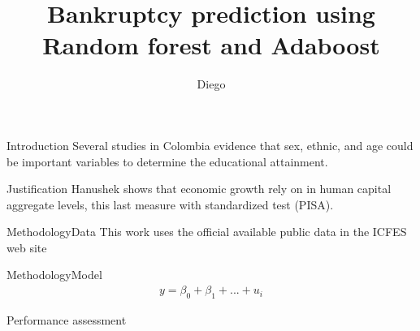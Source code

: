 \documentclass[12pt]{beamer}
\author{Diego}
\title{Bankruptcy prediction using Random forest and Adaboost}
\institute{BIT}
\begin{document}
\begin{frame}
\titlepage
\end{frame}



\begin{frame}{Introduction}
Several studies in Colombia evidence that sex, ethnic, and age could be important variables to determine the educational attainment.
\end{frame}


\begin{frame}{Justification}
Hanushek shows that economic growth rely on in human capital aggregate levels, this last measure with standardized test (PISA).
\end{frame}

\begin{frame}{Methodology}{Data}
This work uses the official available public data in the ICFES web site 
\end{frame}


\begin{frame}{Methodology}{Model}
\begin{equation}
\begin{align*}
y = \beta_{0} + \beta_{1}  +... + u_{i}
\end{align*}
\end{equation}
\end{frame}


\begin{frame}{Performance assessment}
%
\begin{table}[]
\centering
{}
\caption{Own elaboration}
\label{tab:my-table}
\end{table}
\end{frame}


\begin{comment}


\begin{frame}
\begin{table}

\end{table}
\end{frame}

\begin{frame}{Graph}
\texttt{[image: scatter.eps]}
According to the last figure there is a positive relation between var2 and var3.
\end{frame}


\end{comment}
\end{document}
